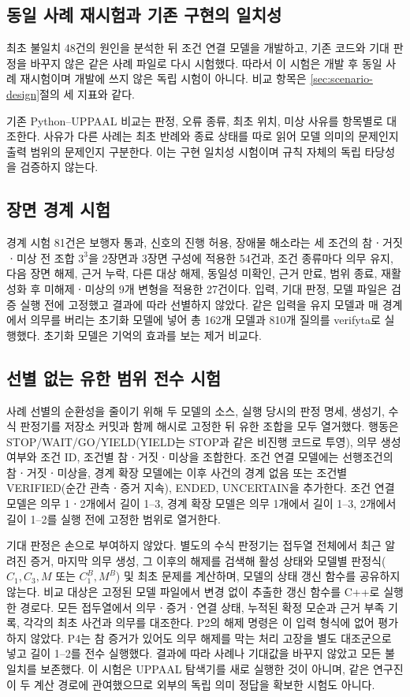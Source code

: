 \begin{revision}
\subsection{동일 사례 재시험과 기존 구현의 일치성}
\label{sec:retest-design}
최초 불일치 48건의 원인을 분석한 뒤 조건 연결 모델을 개발하고, 기존 코드와 기대 판정을 바꾸지 않은 같은 사례 파일로 다시 시험했다. 따라서 이 시험은 개발 후 동일 사례 재시험이며 개발에 쓰지 않은 독립 시험이 아니다. 비교 항목은 \ref{sec:scenario-design}절의 세 지표와 같다.

기존 Python--UPPAAL 비교는 판정, 오류 종류, 최초 위치, 미상 사유를 항목별로 대조한다. 사유가 다른 사례는 최초 반례와 종료 상태를 따로 읽어 모델 의미의 문제인지 출력 범위의 문제인지 구분한다. 이는 구현 일치성 시험이며 규칙 자체의 독립 타당성을 검증하지 않는다.

\subsection{장면 경계 시험}
\label{sec:boundary-design}
경계 시험 81건은 보행자 통과, 신호의 진행 허용, 장애물 해소라는 세 조건의 참ㆍ거짓ㆍ미상 전 조합 $3^3$을 2장면과 3장면 구성에 적용한 54건과, 조건 종류마다 의무 유지, 다음 장면 해제, 근거 누락, 다른 대상 해제, 동일성 미확인, 근거 만료, 범위 종료, 재활성화 후 미해제ㆍ미상의 9개 변형을 적용한 27건이다. 입력, 기대 판정, 모델 파일은 검증 실행 전에 고정했고 결과에 따라 선별하지 않았다. 같은 입력을 유지 모델과 매 경계에서 의무를 버리는 초기화 모델에 넣어 총 162개 모델과 810개 질의를 verifyta로 실행했다. 초기화 모델은 기억의 효과를 보는 제거 비교다.

\subsection{선별 없는 유한 범위 전수 시험}
\label{sec:bounded-design}
사례 선별의 순환성을 줄이기 위해 두 모델의 소스, 실행 당시의 판정 명세, 생성기, 수식 판정기를 저장소 커밋과 함께 해시로 고정한 뒤 유한 조합을 모두 열거했다. 행동은 STOP/WAIT/GO/YIELD(YIELD는 STOP과 같은 비진행 코드로 투영), 의무 생성 여부와 조건 ID, 조건별 참ㆍ거짓ㆍ미상을 조합한다. 조건 연결 모델에는 선행조건의 참ㆍ거짓ㆍ미상을, 경계 확장 모델에는 이후 사건의 경계 없음 또는 조건별 VERIFIED(순간 관측ㆍ증거 지속), ENDED, UNCERTAIN을 추가한다. 조건 연결 모델은 의무 1ㆍ2개에서 길이 1--3, 경계 확장 모델은 의무 1개에서 길이 1--3, 2개에서 길이 1--2를 실행 전에 고정한 범위로 열거한다.

기대 판정은 손으로 부여하지 않았다. 별도의 수식 판정기는 접두열 전체에서 최근 알려진 증거, 마지막 의무 생성, 그 이후의 해제를 검색해 활성 상태와 모델별 판정식($C_1,C_3,M$ 또는 $C_1^B,M^B$) 및 최초 문제를 계산하며, 모델의 상태 갱신 함수를 공유하지 않는다. 비교 대상은 고정된 모델 파일에서 변경 없이 추출한 갱신 함수를 C++로 실행한 경로다. 모든 접두열에서 의무ㆍ증거ㆍ연결 상태, 누적된 확정 모순과 근거 부족 기록, 각각의 최초 사건과 의무를 대조한다. P2의 해제 명령은 이 입력 형식에 없어 평가하지 않았다. P4는 참 증거가 있어도 의무 해제를 막는 처리 고장을 별도 대조군으로 넣고 길이 1--2를 전수 실행했다. 결과에 따라 사례나 기대값을 바꾸지 않았고 모든 불일치를 보존했다. 이 시험은 UPPAAL 탐색기를 새로 실행한 것이 아니며, 같은 연구진이 두 계산 경로에 관여했으므로 외부의 독립 의미 정답을 확보한 시험도 아니다.


\end{revision}
